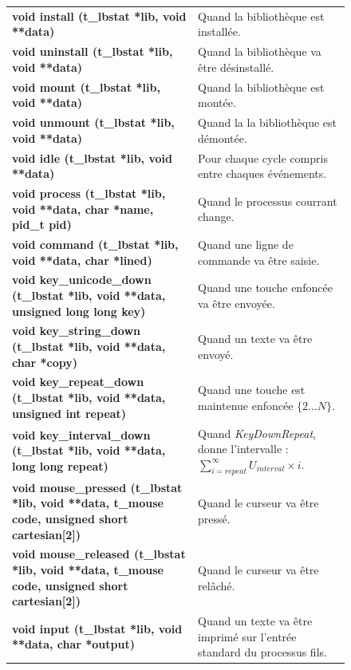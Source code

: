 \documentclass{report}
\newcommand{\violet}{\rowcolor{violet!10}}
\begin{document}
\begin{figure}[!ht]
    \begin{minipage}{\textwidth}
    \centering
        \begin{tabular}{p{}p{}}
            \textbf{void install (t\_lbstat *lib, void **data)} & Quand la bibliothèque est installée. \\
            \textbf{void uninstall (t\_lbstat *lib, void **data)} & Quand la bibliothèque va être désinstallé. \\
            \textbf{void mount (t\_lbstat *lib, void **data)} & Quand la bibliothèque est montée. \\
            \textbf{void unmount (t\_lbstat *lib, void **data)} & Quand la la bibliothèque est démontée. \\
            \textbf{void idle (t\_lbstat *lib, void **data)} & Pour chaque cycle compris entre chaques événements. \\
            \textbf{void process (t\_lbstat *lib, void **data, char *name, pid\_t pid)} & Quand le processus courrant change. \\
            \textbf{void command (t\_lbstat *lib, void **data, char *lined)} & Quand une ligne de commande va être saisie. \\
            \textbf{void key\_unicode\_down (t\_lbstat *lib, void **data, unsigned long long key)} & Quand une touche enfoncée va être envoyée. \\
            \textbf{void key\_string\_down (t\_lbstat *lib, void **data, char *copy)} & Quand un texte va être envoyé. \\
            \violet
            \textbf{void key\_repeat\_down (t\_lbstat *lib, void **data, unsigned int repeat)} & Quand une touche est maintenue enfoncée $\{2\dots{}N\}$. \\
            \violet
            \textbf{void key\_interval\_down (t\_lbstat *lib, void **data, long long repeat)} & Quand \textit{KeyDownRepeat}, donne l'intervalle : $\sum_{i=repeat}^{\infty} U_{interval}\times{}i$. \\
            \textbf{void mouse\_pressed (t\_lbstat *lib, void **data, t\_mouse code, unsigned short cartesian[2])} & Quand le curseur va être pressé. \\
            \textbf{void mouse\_released (t\_lbstat *lib, void **data, t\_mouse code, unsigned short cartesian[2])} & Quand le curseur va être relâché. \\
            \textbf{void input (t\_lbstat *lib, void **data, char *output)} & Quand un texte va être imprimé sur l'entrée standard du processus fils. \\

\end{tabular}
\end{minipage}
\end{figure}
\end{document}
